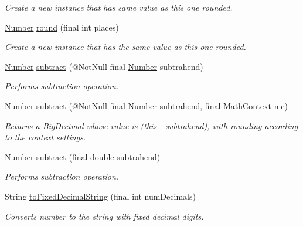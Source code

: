 \begin{DoxyCompactItemize}
\begin{DoxyCompactList}\small\item\em Create a new instance that has same value as this one rounded. \end{DoxyCompactList}\item 
\hyperlink{interfacecom_1_1aarrelaakso_1_1drawl_1_1_number}{Number} \hyperlink{interfacecom_1_1aarrelaakso_1_1drawl_1_1_number_a0d76b3c8e56e9f18a3ce9baf42be705f}{round} (final int places)
\begin{DoxyCompactList}\small\item\em Create a new instance that has the same value as this one rounded. \end{DoxyCompactList}\item 
\hyperlink{interfacecom_1_1aarrelaakso_1_1drawl_1_1_number}{Number} \hyperlink{interfacecom_1_1aarrelaakso_1_1drawl_1_1_number_ac28e81198ea485a48568a9a543cb5293}{subtract} (@Not\+Null final \hyperlink{interfacecom_1_1aarrelaakso_1_1drawl_1_1_number}{Number} subtrahend)
\begin{DoxyCompactList}\small\item\em Performs subtraction operation. \end{DoxyCompactList}\item 
\hyperlink{interfacecom_1_1aarrelaakso_1_1drawl_1_1_number}{Number} \hyperlink{interfacecom_1_1aarrelaakso_1_1drawl_1_1_number_aae7cf801905b2510138d37ff932c4d30}{subtract} (@Not\+Null final \hyperlink{interfacecom_1_1aarrelaakso_1_1drawl_1_1_number}{Number} subtrahend, final Math\+Context mc)
\begin{DoxyCompactList}\small\item\em Returns a Big\+Decimal whose value is (this -\/ subtrahend), with rounding according to the context settings. \end{DoxyCompactList}\item 
\hyperlink{interfacecom_1_1aarrelaakso_1_1drawl_1_1_number}{Number} \hyperlink{interfacecom_1_1aarrelaakso_1_1drawl_1_1_number_ac04969f656d823c91e55a798df7d6913}{subtract} (final double subtrahend)
\begin{DoxyCompactList}\small\item\em Performs subtraction operation. \end{DoxyCompactList}\item 
String \hyperlink{interfacecom_1_1aarrelaakso_1_1drawl_1_1_number_a8e672210b2f919571e6b09d4cb95c569}{to\+Fixed\+Decimal\+String} (final int num\+Decimals)
\begin{DoxyCompactList}\small\item\em Converts number to the string with fixed decimal digits. \end{DoxyCompactList}\item 

\end{DoxyCompactItemize}
